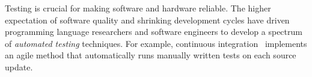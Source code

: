 \documentclass[fleqn,12pt]{article}
\begin{document}
%









Testing is crucial for making software and hardware reliable. The higher
expectation of software quality and shrinking development cycles have
driven programming language researchers and software engineers to
develop a spectrum of \emph{automated testing} techniques.
For example, continuous integration~\cite{duvall2007continuous} 
implements an agile method that automatically runs manually written tests on each source update.
\end{document}
